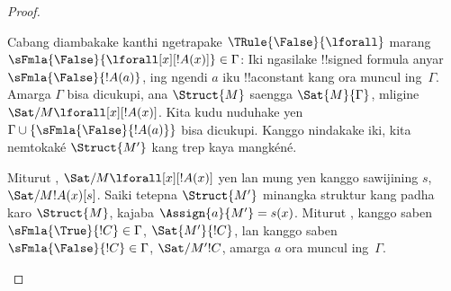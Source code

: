 \documentclass[../../../include/open-logic-section]{subfiles}
\begin{document}
\begin{proof}
\begin{enumerate}
{\item Cabang diambakake kanthi ngetrapake $\TRule{\False}{\lforall}$
  marang $\sFmla{\False}{\lforall[x][!A(x)]} \in \Gamma$: Iki
  ngasilake !!{signed formula} anyar~$\sFmla{\False}{!A(a)}$, ing
  ngendi $a$ iku !!a{constant} kang ora muncul ing~$\Gamma$. Amarga
  $\Gamma$ bisa dicukupi, ana $\Struct{M}$ saengga
  $\Sat{M}{\Gamma}$, mligine
  $\Sat/{M}{\lforall[x][!A(x)]}$. Kita kudu nuduhake yen $\Gamma \cup
  \{\sFmla{\False}{!A(a)}\}$ bisa dicukupi. Kanggo nindakake iki,
  kita nemtokaké $\Struct{M'}$ kang trep kaya mangkéné.

  Miturut ,
  $\Sat/{M}{\lforall[x][!A(x)]}$ yen lan mung yen kanggo sawijining
  $s$, $\Sat/{M}{!A(x)}[s]$. Saiki tetepna $\Struct{M'}$ minangka
  struktur kang padha karo $\Struct{M}$, kajaba $\Assign{a}{M'} = s(x)$. Miturut
  , kanggo saben
  $\sFmla{\True}{!C} \in \Gamma$, $\Sat{M'}{!C}$, lan kanggo saben
  $\sFmla{\False}{!C} \in \Gamma$, $\Sat/{M'}{!C}$, amarga $a$ ora
  muncul ing~$\Gamma$.

}
\end{enumerate}
\end{proof}
\end{document}
